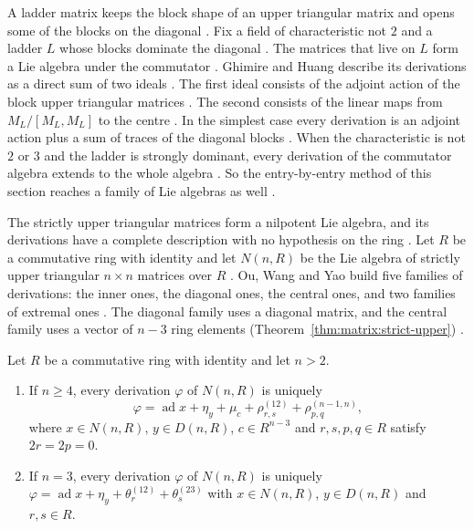 A ladder matrix keeps the block shape of an upper triangular matrix and opens
some of the blocks on the diagonal \cite[p.~1]{GhimireHuang2015}. Fix a
field of characteristic not $2$ and a ladder $L$ whose blocks dominate the
diagonal \cite[Definition~2.2, p.~2]{GhimireHuang2015}. The matrices that
live on $L$ form a Lie algebra under the commutator
\cite[p.~1]{GhimireHuang2015}. Ghimire and Huang describe its derivations
as a direct sum of two ideals \cite[Theorem~3.1, p.~7]{GhimireHuang2015}.
The first ideal consists of the adjoint action of the block upper triangular
matrices \cite[p.~7]{GhimireHuang2015}. The second consists of the linear maps from $M_L/[M_L,M_L]$ to the
centre \cite[p.~7]{GhimireHuang2015}. In the simplest case every
derivation is an adjoint action plus a sum of traces of the diagonal blocks
\cite[p.~7]{GhimireHuang2015}. When the characteristic is not $2$ or $3$
and the ladder is strongly dominant, every derivation of the commutator algebra
extends to the whole algebra \cite[Theorem~5.3 and Corollary~5.4, p.~18]{GhimireHuang2015}.
So the entry-by-entry method of this section reaches a family of Lie algebras
as well \cite[p.~1]{GhimireHuang2015}.

The strictly upper triangular matrices form a nilpotent Lie algebra, and its
derivations have a complete description with no hypothesis on the ring
\cite[p.~378]{OuWangYao2007}. Let $R$ be a commutative ring with identity and
let $N(n,R)$ be the Lie algebra of strictly upper triangular $n\times n$
matrices over $R$ \cite[p.~378]{OuWangYao2007}. Ou, Wang and Yao build five
families of derivations: the inner ones, the diagonal ones, the central ones,
and two families of extremal ones \cite[pp.~379--380]{OuWangYao2007}. The
diagonal family uses a diagonal matrix, and the central family uses a vector
of $n-3$ ring elements (Theorem~\ref{thm:matrix:strict-upper}) \cite[pp.~379--380]{OuWangYao2007}.

\begin{theorem}\label{thm:matrix:strict-upper}
Let $R$ be a commutative ring with identity and let $n>2$.
\begin{enumerate}
\item If $n\geq4$, every derivation $\varphi$ of $N(n,R)$ is uniquely
\[
\varphi=\operatorname{ad}x+\eta_y+\mu_c+\rho^{(12)}_{r,s}+\rho^{(n-1,n)}_{p,q},
\]
where $x\in N(n,R)$, $y\in D(n,R)$, $c\in R^{n-3}$ and $r,s,p,q\in R$ satisfy
$2r=2p=0$.
\item If $n=3$, every derivation $\varphi$ of $N(n,R)$ is uniquely
$\varphi=\operatorname{ad}x+\eta_y+\theta^{(12)}_r+\theta^{(23)}_s$ with
$x\in N(n,R)$, $y\in D(n,R)$ and $r,s\in R$.
\end{enumerate}
\end{theorem}

